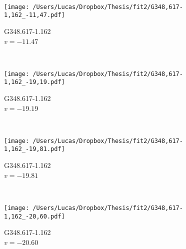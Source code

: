 \begin{figure*}[t]
\begin{subfigure}[t]{0.3\textwidth}
	\end{subfigure}
	~
	\begin{subfigure}[t]{0.3\textwidth}
		\texttt{[image: /Users/Lucas/Dropbox/Thesis/fit2/G348,617-1,162\_-11,47.pdf]}
		\caption[]{G348.617-1.162\\$v=-11.47$\,\kms}
	\end{subfigure}
	~
	\begin{subfigure}[t]{0.3\textwidth}
		\texttt{[image: /Users/Lucas/Dropbox/Thesis/fit2/G348,617-1,162\_-19,19.pdf]}
		\caption[]{G348.617-1.162\\$v=-19.19$\,\kms}
	\end{subfigure}
	~
	\begin{subfigure}[t]{0.3\textwidth}
		\texttt{[image: /Users/Lucas/Dropbox/Thesis/fit2/G348,617-1,162\_-19,81.pdf]}
		\caption[]{G348.617-1.162\\$v=-19.81$\,\kms}
	\end{subfigure}
	~
	\begin{subfigure}[t]{0.3\textwidth}
		\texttt{[image: /Users/Lucas/Dropbox/Thesis/fit2/G348,617-1,162\_-20,60.pdf]}
		\caption[]{G348.617-1.162\\$v=-20.60$\,\kms}
	\end{subfigure}
	~
\end{figure*}
\clearpage
